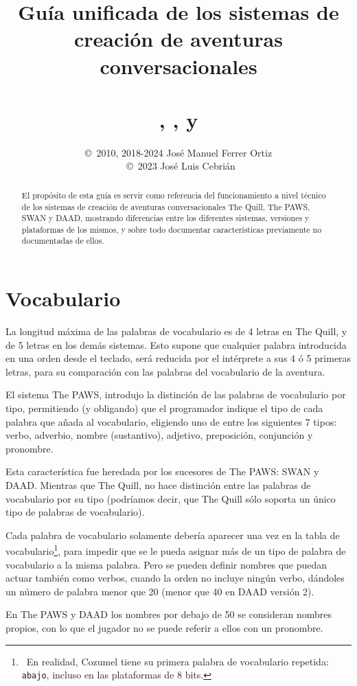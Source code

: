 \documentclass[11pt, a5paper]{article}
\title{Guía unificada de los sistemas de creación de aventuras conversacionales
       \\\ \\\Huge{\quill, \paw, \swan y \daad}}
\author{\copyright\ 2010, 2018-2024 José Manuel Ferrer Ortiz
       \\\ \copyright\ 2023 José Luis Cebrián}
\newcommand{\quill}{\textsf{The Quill}\xspace}
\newcommand{\paw}{\textsf{The PAWS}\xspace}
\newcommand{\swan}{\textsf{SWAN}\xspace}
\newcommand{\daad}{\textsf{DAAD}\xspace}
\begin{document}
\maketitle
\tableofcontents
\newpage

\begin{abstract}
El propósito de esta guía es servir como referencia del funcionamiento a nivel técnico de los sistemas de creación de aventuras conversacionales \quill, \paw, \swan y \daad, mostrando diferencias entre los diferentes sistemas, versiones y plataformas de los mismos, y sobre todo documentar características previamente no documentadas de ellos.
\end{abstract}

\section{Vocabulario}\label{vocab}

La longitud máxima de las palabras de vocabulario es de 4 letras en \quill, y de 5 letras en los demás sistemas. Esto supone que cualquier palabra introducida en una orden desde el teclado, será reducida por el intérprete a sus 4 ó 5 primeras letras, para su comparación con las palabras del vocabulario de la aventura.

El sistema \paw, introdujo la distinción de las palabras de vocabulario por tipo, permitiendo (y obligando) que el programador indique el tipo de cada palabra que añada al vocabulario, eligiendo uno de entre los siguientes 7 tipos: verbo, adverbio, nombre (sustantivo), adjetivo, preposición, conjunción y pronombre.

Esta característica fue heredada por los sucesores de \paw: \swan y \daad. Mientras que \quill, no hace distinción entre las palabras de vocabulario por su tipo (podríamos decir, que \quill sólo soporta un único tipo de palabras de vocabulario).

Cada palabra de vocabulario solamente debería aparecer una vez en la tabla de vocabulario\footnote{\ En realidad, Cozumel tiene su primera palabra de vocabulario repetida: \texttt{abajo}, incluso en las plataformas de 8 bits.}, para impedir que se le pueda asignar más de un tipo de palabra de vocabulario a la misma palabra. Pero se pueden definir nombres que puedan actuar también como verbos, cuando la orden no incluye ningún verbo, dándoles un número de palabra menor que 20 \cite[sección VOC]{PawsPC} (menor que 40 en DAAD versión 2).

En \paw y \daad los nombres por debajo de 50 se consideran nombres propios, con lo que el jugador no se puede referir a ellos con un pronombre.
\end{document}
